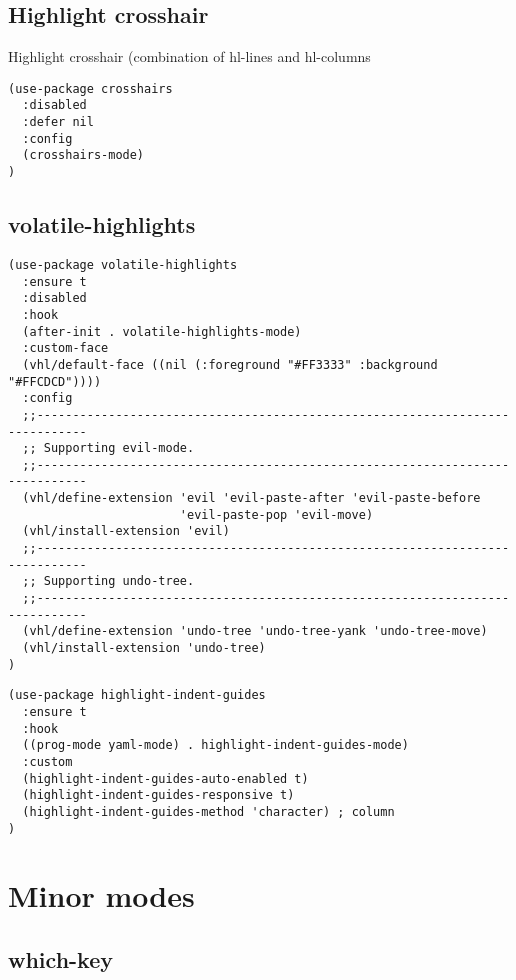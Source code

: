 \documentclass[11pt]{article}
\begin{document}
\subsection*{Highlight crosshair}
\label{sec:orgddf568c}

Highlight crosshair (combination of hl-lines and hl-columns

\begin{verbatim}
(use-package crosshairs
  :disabled
  :defer nil
  :config
  (crosshairs-mode)
)
\end{verbatim}

\subsection*{volatile-highlights}
\label{sec:org080a0df}

\begin{verbatim}
(use-package volatile-highlights
  :ensure t
  :disabled
  :hook
  (after-init . volatile-highlights-mode)
  :custom-face
  (vhl/default-face ((nil (:foreground "#FF3333" :background "#FFCDCD"))))
  :config
  ;;-----------------------------------------------------------------------------
  ;; Supporting evil-mode.
  ;;-----------------------------------------------------------------------------
  (vhl/define-extension 'evil 'evil-paste-after 'evil-paste-before
                        'evil-paste-pop 'evil-move)
  (vhl/install-extension 'evil)
  ;;-----------------------------------------------------------------------------
  ;; Supporting undo-tree.
  ;;-----------------------------------------------------------------------------
  (vhl/define-extension 'undo-tree 'undo-tree-yank 'undo-tree-move)
  (vhl/install-extension 'undo-tree)
)
\end{verbatim}


\begin{verbatim}
(use-package highlight-indent-guides
  :ensure t
  :hook
  ((prog-mode yaml-mode) . highlight-indent-guides-mode)
  :custom
  (highlight-indent-guides-auto-enabled t)
  (highlight-indent-guides-responsive t)
  (highlight-indent-guides-method 'character) ; column
)
\end{verbatim}


\section*{Minor modes}
\label{sec:orgfcd4d6a}

\subsection*{which-key}
\label{sec:orge950add}
\end{document}
